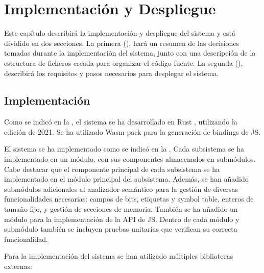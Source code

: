 \chapter{Implementación y Despliegue}\label{chap:implementation}

Este capítulo describirá la implementación y despliegue del sistema y está
dividido en dos secciones. La primera (), hará un
resumen de las decisiones tomadas durante la implementación del sistema, junto
con una descripción de la estructura de ficheros creada para organizar el código
fuente. La segunda (), describirá los requisitos y pasos
necesarios para desplegar el sistema.

\section{Implementación}\label{sec:implementation}

Como se indicó en la , el sistema se ha desarrollado en
Rust \parencite{Rust}, utilizando la edición de 2021. Se ha utilizado Wasm-pack
\parencite{Wasm-pack} para la generación de \glspl{binding} de \gls{JS}.

El sistema se ha implementado como se indicó en la .
Cada subsistema se ha implementado en un módulo, con sus componentes almacenados
en submódulos. Cabe destacar que el componente principal de cada subsistema se
ha implementado en el módulo principal del subsistema. Además, se han añadido
submódulos adicionales al analizador semántico para la gestión de diversas
funcionalidades necesarias: campos de bits, etiquetas y \gls{symbol table},
enteros de tamaño fijo, y gestión de secciones de memoria. También se ha añadido
un módulo para la implementación de la \gls{API} de \gls{JS}. Dentro de cada
módulo y submódulo también se incluyen pruebas unitarias que verifican su
correcta funcionalidad.

\noindent
Para la implementación del sistema se han utilizado múltiples bibliotecas
externas:

\newcommand{\libref}[1]{\textit{#1} \parencite{#1}}

